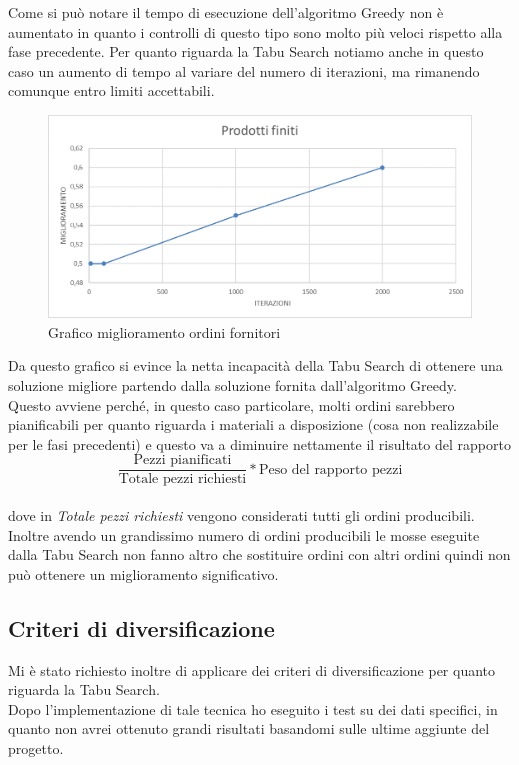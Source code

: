 Come si può notare il tempo di esecuzione dell'algoritmo Greedy non è aumentato in quanto i controlli di questo tipo sono molto più veloci rispetto alla fase precedente.
Per quanto riguarda la Tabu Search notiamo anche in questo caso un aumento di tempo al variare del numero di iterazioni, ma rimanendo comunque entro limiti accettabili.

\begin{figure}[H]
	\includegraphics[width=15cm]{immagini/graficofo3.png}
	\centering
	\caption{Grafico miglioramento ordini fornitori}
\end{figure}

Da questo grafico si evince la netta incapacità della Tabu Search di ottenere una soluzione migliore partendo dalla soluzione fornita dall'algoritmo Greedy.\\
Questo avviene perché, in questo caso particolare, molti ordini sarebbero pianificabili per quanto riguarda i materiali a disposizione (cosa non realizzabile per le fasi
precedenti) e questo va a diminuire nettamente il risultato del rapporto \[\frac{\text{Pezzi pianificati}}{\text{Totale pezzi richiesti}} * \text{Peso del rapporto pezzi}\]\\
dove in \textit{Totale pezzi richiesti} vengono considerati tutti gli ordini producibili.\\ Inoltre avendo un grandissimo numero di ordini producibili le mosse eseguite 
dalla Tabu Search non fanno altro che sostituire ordini con altri ordini quindi non può ottenere un miglioramento significativo.

\newpage
\subsection{Criteri di diversificazione}

Mi è stato richiesto inoltre di applicare dei criteri di diversificazione per quanto riguarda la Tabu Search.\\ Dopo l'implementazione di tale tecnica ho eseguito i test su dei
dati specifici, in quanto non avrei ottenuto grandi risultati basandomi sulle ultime aggiunte del progetto.


